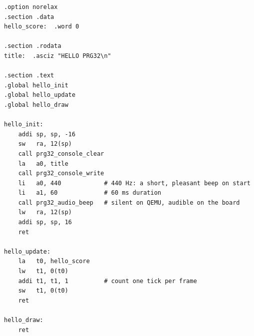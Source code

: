 \begin{lstlisting}[style=asm,caption={A complete, minimal ASCII game.}]
.option norelax
.section .data
hello_score:  .word 0

.section .rodata
title:  .asciz "HELLO PRG32\n"

.section .text
.global hello_init
.global hello_update
.global hello_draw

hello_init:
    addi sp, sp, -16
    sw   ra, 12(sp)
    call prg32_console_clear
    la   a0, title
    call prg32_console_write
    li   a0, 440            # 440 Hz: a short, pleasant beep on start
    li   a1, 60             # 60 ms duration
    call prg32_audio_beep   # silent on QEMU, audible on the board
    lw   ra, 12(sp)
    addi sp, sp, 16
    ret

hello_update:
    la   t0, hello_score
    lw   t1, 0(t0)
    addi t1, t1, 1          # count one tick per frame
    sw   t1, 0(t0)
    ret

hello_draw:
    ret
\end{lstlisting}